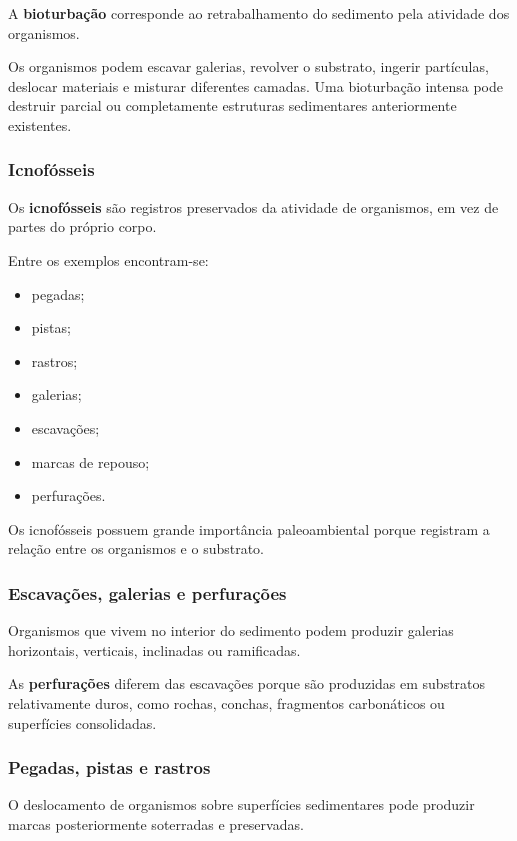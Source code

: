 A \textbf{bioturbação} corresponde ao retrabalhamento do sedimento pela atividade
dos organismos.

Os organismos podem escavar galerias, revolver o substrato, ingerir partículas,
deslocar materiais e misturar diferentes camadas. Uma bioturbação intensa pode
destruir parcial ou completamente estruturas sedimentares anteriormente
existentes.

\subsubsection{Icnofósseis}

Os \textbf{icnofósseis} são registros preservados da atividade de organismos, em
vez de partes do próprio corpo.

Entre os exemplos encontram-se:

\begin{itemize}
    \item pegadas;
    \item pistas;
    \item rastros;
    \item galerias;
    \item escavações;
    \item marcas de repouso;
    \item perfurações.
\end{itemize}

Os icnofósseis possuem grande importância paleoambiental porque registram a
relação entre os organismos e o substrato.

\subsubsection{Escavações, galerias e perfurações}

Organismos que vivem no interior do sedimento podem produzir galerias
horizontais, verticais, inclinadas ou ramificadas.

As \textbf{perfurações} diferem das escavações porque são produzidas em
substratos relativamente duros, como rochas, conchas, fragmentos carbonáticos ou
superfícies consolidadas.

\subsubsection{Pegadas, pistas e rastros}

O deslocamento de organismos sobre superfícies sedimentares pode produzir marcas
posteriormente soterradas e preservadas.

